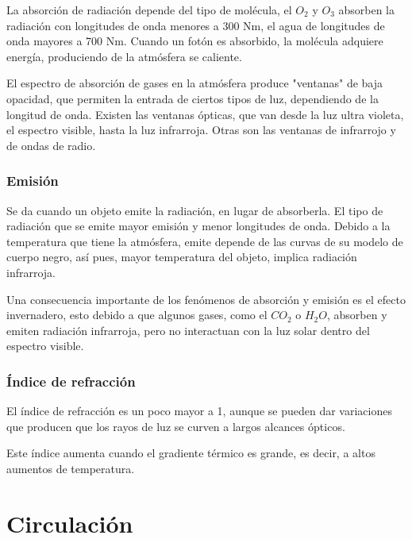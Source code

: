 \documentclass{article}
\begin{document}
La absorción de radiación depende del tipo de molécula, el $O_2$ y $O_3$ absorben la radiación con longitudes de onda menores a 300 Nm, el agua de longitudes de onda mayores a 700 Nm. Cuando un fotón es absorbido, la molécula adquiere energía, produciendo de la atmósfera se caliente. 

El espectro de absorción de gases en la atmósfera produce "ventanas" de baja opacidad, que permiten la entrada de ciertos tipos de luz, dependiendo de la longitud de onda. Existen las ventanas ópticas, que van desde la luz ultra violeta, el espectro visible, hasta la luz infrarroja. Otras son las ventanas de infrarrojo y de ondas de radio. 


\subsubsection {Emisión}

Se da cuando un objeto emite la radiación, en lugar de absorberla. El tipo de radiación que se emite mayor emisión y menor longitudes de onda.  Debido a la temperatura que tiene la atmósfera, emite depende de las curvas de su modelo de cuerpo negro, así pues, mayor temperatura del objeto, implica radiación infrarroja. 

Una consecuencia importante de los fenómenos de absorción y emisión es el efecto invernadero, esto debido a que algunos gases, como el $CO_2$ o $H_2O$, absorben y emiten radiación infrarroja, pero no interactuan con la luz solar dentro del espectro visible. 


\subsubsection {Índice de refracción}

El índice de refracción es un poco mayor a 1, aunque se pueden dar variaciones que producen que los rayos de luz se curven a largos alcances ópticos. 

Este índice aumenta cuando el gradiente térmico es grande, es decir, a altos aumentos de temperatura. 



\section{Circulación}
\end{document}
